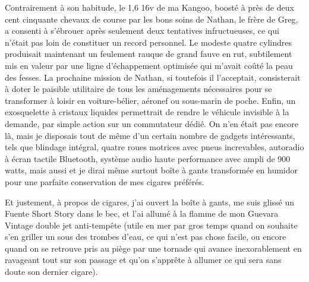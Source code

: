 Contrairement à son habitude, le 1,6 16v de ma Kangoo, boosté à près de deux cent cinquante chevaux de course par les bons soins de Nathan, le frère de Greg, a consenti à s’ébrouer après seulement deux tentatives infructueuses, ce qui n’était pas loin de constituer un record personnel. Le modeste quatre cylindres produisait maintenant un feulement rauque de grand fauve en rut, subtilement mis en valeur par une ligne d’échappement optimisée qui m’avait coûté la peau des fesses. La prochaine mission de Nathan, si toutefois il l’acceptait, consisterait à doter le paisible utilitaire de tous les aménagements nécessaires pour se transformer à loisir en voiture-bélier, aéronef ou sous-marin de poche. Enfin, un exosquelette à cristaux liquides permettrait de rendre le véhicule invisible à la demande, par simple action sur un commutateur dédié. On n’en était pas encore là, mais je disposais tout de même d’un certain nombre de gadgets intéressants, tels que blindage intégral, quatre roues motrices avec pneus increvables, autoradio à écran tactile Bluetooth, système audio haute performance avec ampli de 900 watts, mais aussi et je dirai même surtout boîte à gants transformée en humidor pour une parfaite conservation de mes cigares préférés.

%
%
%
Et justement, à propos de cigares, j’ai ouvert la boîte à gants, me suis glissé un Fuente Short Story dans le bec, et l’ai allumé à la flamme de mon Guevara Vintage double jet anti-tempête (utile en mer par gros temps quand on souhaite s’en griller un sous des trombes d’eau, ce qui n’est pas chose facile, ou encore quand on se retrouve pris au piège par une tornade qui avance inexorablement en ravageant tout sur son passage et qu’on s’apprête à allumer ce qui sera sans doute son dernier cigare).

